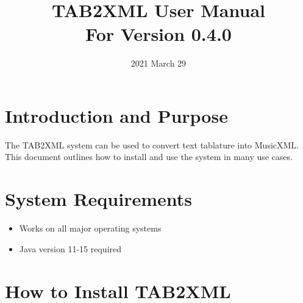\documentclass[11pt]{article}
\date{2021 March 29}
\title{TAB2XML User Manual\\\medskip
\large For Version 0.4.0}
\begin{document}
\maketitle
\tableofcontents

\newpage

\section{Introduction and Purpose}
\label{sec:org3eaa42f}
The TAB2XML system can be used to convert text tablature into MusicXML.  This document outlines how to install and use the system in many use cases.
\section{System Requirements}
\label{sec:org174dc17}
\begin{itemize}
\item Works on all major operating systems
\item Java version 11-15 required
\end{itemize}
\section{How to Install TAB2XML}
\label{sec:org827557a}
\end{document}
